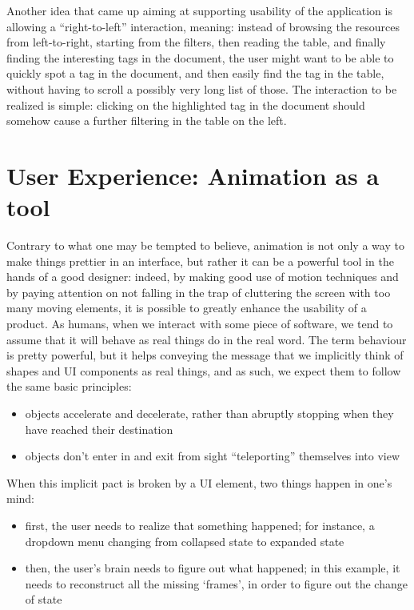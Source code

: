 \documentclass[12pt,oneside,svgnames]{memoir}
\begin{document}
Another idea that came up aiming at supporting usability of the
application is allowing a ``right-to-left'' interaction, meaning:
instead of browsing the resources from left-to-right, starting from the
filters, then reading the table, and finally finding the interesting
tags in the document, the user might want to be able to quickly spot a
tag in the document, and then easily find the tag in the table, without
having to scroll a possibly very long list of those. The interaction to
be realized is simple: clicking on the highlighted tag in the document
should somehow cause a further filtering in the table on the left.

\section{User Experience: Animation as a
tool}\label{user-experience-animation-as-a-tool}

Contrary to what one may be tempted to believe, animation is not only a
way to make things prettier in an interface, but rather it can be a
powerful tool in the hands of a good designer: indeed, by making good
use of motion techniques and by paying attention on not falling in the
trap of cluttering the screen with too many moving elements, it is
possible to greatly enhance the usability of a product. As humans, when
we interact with some piece of software, we tend to assume that it will
behave as real things do in the real word. The term behaviour is pretty
powerful, but it helps conveying the message that we implicitly think of
shapes and UI components as real things, and as such, we expect them to
follow the same basic principles:

\begin{itemize}
\itemsep1pt\parskip0pt
\item
  objects accelerate and decelerate, rather than abruptly stopping when
  they have reached their destination
\item
  objects don't enter in and exit from sight ``teleporting'' themselves
  into view
\end{itemize}

When this implicit pact is broken by a UI element, two things happen in
one's mind:

\begin{itemize}
\itemsep1pt\parskip0pt
\item
  first, the user needs to realize that something happened; for
  instance, a dropdown menu changing from collapsed state to expanded
  state
\item
  then, the user's brain needs to figure out what happened; in this
  example, it needs to reconstruct all the missing `frames', in order to
  figure out the change of state
\end{itemize}
\end{document}
